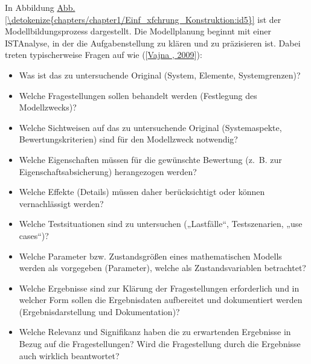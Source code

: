 \documentclass[letterpaper,10pt,german]{jupyterBook}
\begin{document}
\sphinxAtStartPar
In Abbildung \hyperref[\detokenize{chapters/chapter1/Einf_xfchrung_Konstruktion:id5}]{Abb.\@ \ref{\detokenize{chapters/chapter1/Einf_xfchrung_Konstruktion:id5}}} ist der Modellbildungsprozess dargestellt. Die Modellplanung beginnt mit einer IST\sphinxhyphen{}Analyse, in der die Aufgabenstellung zu klären und zu präzisieren ist. Dabei treten typischerweise Fragen auf wie ({[}\hyperlink{cite.quellen:id16}{Vajna , 2009}{]}):
\begin{itemize}
\item {} 
\sphinxAtStartPar
Was ist das zu untersuchende Original (System, Elemente, Systemgrenzen)?

\item {} 
\sphinxAtStartPar
Welche Fragestellungen sollen behandelt werden (Festlegung des Modellzwecks)?

\item {} 
\sphinxAtStartPar
Welche Sichtweisen auf das zu untersuchende Original (Systemaspekte, Bewertungskriterien) sind für den Modellzweck notwendig?

\item {} 
\sphinxAtStartPar
Welche Eigenschaften müssen für die gewünschte Bewertung (z. B. zur Eigenschaftsabsicherung) herangezogen werden?

\item {} 
\sphinxAtStartPar
Welche Effekte (Details) müssen daher berücksichtigt oder können vernachlässigt werden?

\item {} 
\sphinxAtStartPar
Welche Testsituationen sind zu untersuchen („Lastfälle“, Testszenarien, „use cases“)?

\item {} 
\sphinxAtStartPar
Welche Parameter bzw. Zustandsgrößen eines mathematischen Modells werden als vorgegeben (Parameter), welche als Zustandsvariablen betrachtet?

\item {} 
\sphinxAtStartPar
Welche Ergebnisse sind zur Klärung der Fragestellungen erforderlich und in welcher Form sollen die Ergebnisdaten aufbereitet und dokumentiert werden (Ergebnisdarstellung und Dokumentation)?

\item {} 
\sphinxAtStartPar
Welche Relevanz und Signifikanz haben die zu erwartenden Ergebnisse in Bezug auf die Fragestellungen? Wird die Fragestellung durch die Ergebnisse auch wirklich beantwortet?

\end{itemize}
\end{document}
